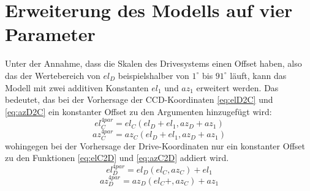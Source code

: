 \section{Erweiterung des Modells auf vier Parameter}
Unter der Annahme, dass die Skalen des Drivesystems einen Offset haben, also das der Wertebereich von $el_D$ beispielshalber von $1^{\circ}$ bis $91^{\circ}$ läuft, kann das Modell mit zwei additiven Konstanten $el_1$ und $az_1$ erweitert werden. Das bedeutet, das bei der Vorhersage der CCD-Koordinaten \ref{eq:elD2C} und \ref{eq:azD2C} ein konstanter Offset zu den Argumenten hinzugefügt wird:
\begin{equation}
el_C^{4par}=el_C(el_D+el_1,az_D+az_1)
\label{eq:elD2C4}
\end{equation}
\begin{equation}
az_C^{4par}=az_C(el_D+el_1,az_D+az_1)
\label{eq:azD2C4}
\end{equation}
wohingegen bei der Vorhersage der Drive-Koordinaten nur ein konstanter Offset zu den Funktionen \ref{eq:elC2D} und \ref{eq:azC2D} addiert wird.
\begin{equation}
el_D^{4par}=el_D(el_C,az_C)+el_1
\label{eq:elD2C4}
\end{equation}
\begin{equation}
az_D^{4par}=az_D(el_C+,az_C)+az_1
\label{eq:azD2C4}
\end{equation}
